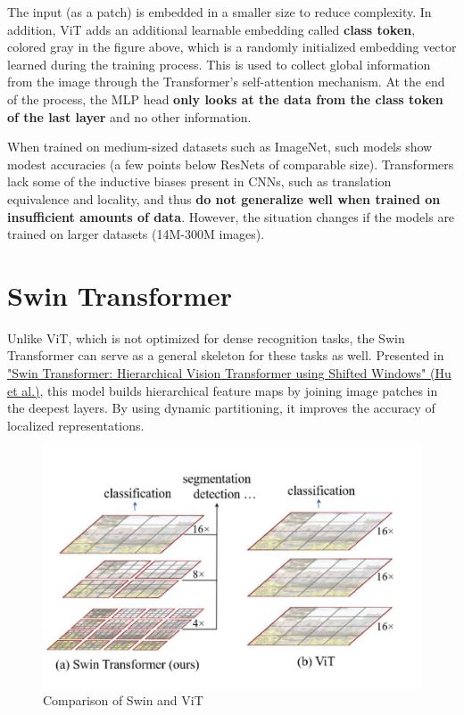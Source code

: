 The input (as a patch) is embedded in a smaller size to reduce complexity. In addition, ViT adds an additional learnable embedding called \textbf{class token}, colored gray in the figure above, which is a randomly initialized embedding vector learned during the training process. This is used to collect global information from the image through the Transformer's self-attention mechanism. At the end of the process, the MLP head \textbf{only looks at the data from the class token of the last layer} and no other information.

When trained on medium-sized datasets such as ImageNet, such models show modest accuracies (a few points below ResNets of comparable size). Transformers lack some of the inductive biases present in CNNs, such as translation equivalence and locality, and thus \textbf{do not generalize well when trained on insufficient amounts of data}. However, the situation changes if the models are trained on larger datasets (14M-300M images).

\section{Swin Transformer}

Unlike ViT, which is not optimized for dense recognition tasks, the Swin Transformer can serve as a general skeleton for these tasks as well. Presented in \href{https://arxiv.org/pdf/2103.14030}{"Swin Transformer: Hierarchical Vision Transformer using Shifted Windows" (Hu et al.)}, this model builds hierarchical feature maps by joining image patches in the deepest layers. By using dynamic partitioning, it improves the accuracy of localized representations. 

\begin{figure}[!htbp]
    \centering
    \includegraphics[width=0.85\linewidth]{tikz/Swin Transformer.png}
    \caption{{ Comparison of Swin and ViT}}
\end{figure}

